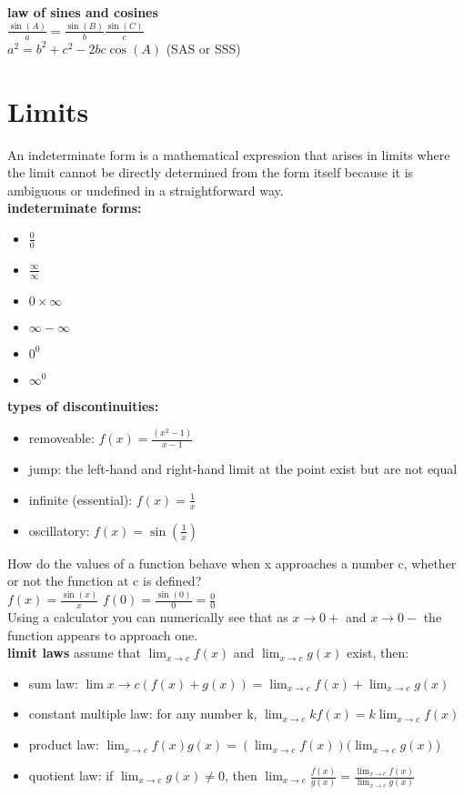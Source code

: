 \documentclass{article}
\begin{document}
\textbf{law of sines and cosines}\\

	$\frac{\sin(A)}{a} = \frac{\sin(B)}{b} \frac{\sin(C)}{c}$\\
	$a^2 = b^2 + c^2 - 2bc\cos(A)$ (SAS or SSS)

\section*{Limits}

An indeterminate form is a mathematical expression that arises in limits where the limit cannot be directly determined from the form itself because it is ambiguous or undefined in a straightforward way.\\

\textbf{indeterminate forms:}
	\begin{itemize}
		\item $\frac{0}{0}$
		\item $\frac{\infty}{\infty}$
		\item $0 \times \infty$
		\item $\infty - \infty$
		\item $0^0$
		\item $\infty^0$
	\end{itemize}

\textbf{types of discontinuities:}
	\begin{itemize}
		\item removeable: $f(x) = \frac{(x^2 - 1)}{x - 1}$
		\item jump: the left-hand and right-hand limit at the point exist but are not equal
		\item infinite (essential): $f(x) = \frac{1}{x}$
		\item oscillatory: $f(x) = \sin(\frac{1}{x})$
	\end{itemize}

How do the values of a function behave when x approaches a number c, whether or not the function at c is defined?\\
$f(x) = \frac{\sin(x)}{x}$
$f(0) = \frac{\sin(0)}{0} = \frac{0}{0}$\\
Using a calculator you can numerically see that as $x \to 0+$ and $x \to 0-$ the function appears to approach one.\\

\textbf{limit laws} assume that $\lim_{x \to c}f(x)$ and $\lim_{x \to c}g(x)$ exist, then:
	\begin{itemize}
		\item sum law: $\lim{x \to c}(f(x) + g(x)) = \lim_{x \to c}f(x) + \lim_{x \to c}g(x)$
		\item constant multiple law: for any number k, $\lim_{x \to c}kf(x) = k\lim_{x \to c}f(x)$
		\item product law: $\lim_{x \to c}f(x)g(x) = (\lim_{x \to c}f(x))(\lim_{x \to c}g(x)$)
		\item quotient law: if $\lim_{x \to c}g(x) \neq 0$, then $\lim_{x \to c}\frac{f(x)}{g(x)} = \frac{\lim_{x \to c}f(x)}{\lim_{x \to c}g(x)}$
	\end{itemize}
\end{document}
